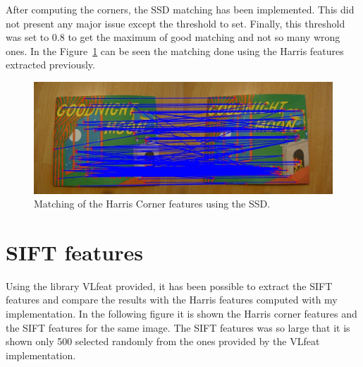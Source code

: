 \documentclass{ethz_report}
\begin{document}
After computing the corners, the SSD matching has been implemented. This did not present any major
issue except the threshold to set. Finally, this threshold was set to $0.8$ to get the maximum of
good matching and not so many wrong ones. In the Figure~\ref{img:matching} can be seen the matching
done using the Harris features extracted previously.

\begin{figure}[H]
\centering
\includegraphics[width=1\linewidth]{images/matching_harris}
\caption{Matching of the Harris Corner features using the SSD.}
\label{img:matching}
\end{figure}

\section{SIFT features}

Using the library VLfeat provided, it has been possible to extract the SIFT features and compare
the results with the Harris features computed with my implementation. In the following figure it is
shown the Harris corner features and the SIFT features for the same image. The SIFT features was so
large that it is shown only 500 selected randomly from the ones provided by the VLfeat implementation.
\end{document}
